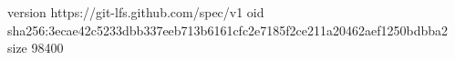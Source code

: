 version https://git-lfs.github.com/spec/v1
oid sha256:3ecae42c5233dbb337eeb713b6161cfc2e7185f2ce211a20462aef1250bdbba2
size 98400
